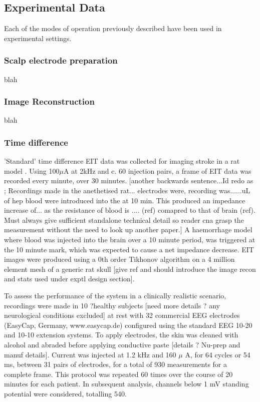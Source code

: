 \subsection{Experimental Data}


Each of the modes of operation previously described have been used in experimental settings. 

\subsubsection{Scalp electrode preparation}
blah
\subsubsection{Image Reconstruction}
blah





\subsubsection{Time difference}
\label{methodsTD}
'Standard' time difference EIT data was collected for imaging stroke in a rat model \cite{Dowrick_2016}. Using 100\( \mu \)A at 2kHz and c. 60 injection pairs, a frame of EIT data was recorded every minute, over 30 minutes. [another backwards sentence...Id redo as ; Recordings made in the anethetised rat... electrodes were, recording was......uL of hep blood were introduced into the at 10 min. This produced an impedance increase of... as the resistance of blood is .... (ref) comapred to that of brain (ref). Must always give sufficient standalone technical detail so reader cna grasp the measurement without the need to look up another paper.] A haemorrhage model where blood was injected into the brain over a 10 minute period, was triggered at the 10 minute mark, which was expected to cause a net impedance decrease. EIT images were produced using a 0th order Tikhonov algorithm on a 4 million element mesh of a generic rat skull [give ref and should introduce the image recon and stats used under exptl design section].

To assess the performance of the system in a clinically realistic scenario, recordings were made in 10 ?healthy subjects [need more details ? any neurological conditions excluded] at rest with 32 commercial EEG electrodes (EasyCap, Germany, www.easycap.de) configured using the standard EEG 10-20 \cite{Jasper1958} and 10-10 extension \cite{Oostenveld2001} systems. To apply electrodes, the skin was cleaned with alcohol and abraded before applying conductive paste [details ? Nu-prep and manuf details]. Current was injected at 1.2 kHz and 160 $\mu$ A, for 64 cycles or 54 ms, between 31 pairs of electrodes, for a total of 930 measurements for a complete frame. This protocol was repeated 60 times over the course of 20 minutes for each patient. In subsequent analysis, channels below 1 mV standing potential were considered, totalling 540. 

